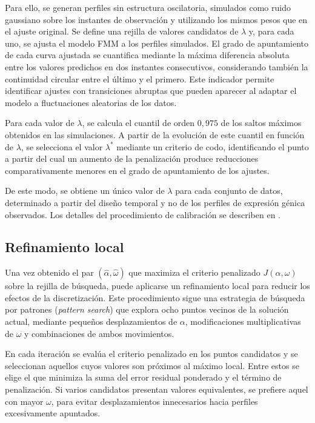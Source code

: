 \documentclass[12pt, a4paper]{report}
\begin{document}
Para ello, se generan perfiles sin estructura oscilatoria, simulados como ruido gaussiano sobre los instantes de observación y utilizando los mismos pesos que en el ajuste original. Se define una rejilla de valores candidatos de \(\lambda\) y, para cada uno, se ajusta el modelo FMM a los perfiles simulados. El grado de apuntamiento de cada curva ajustada se cuantifica mediante la máxima diferencia absoluta entre los valores predichos en dos instantes consecutivos, considerando también la continuidad circular entre el último y el primero. Este indicador permite identificar ajustes con transiciones abruptas que pueden aparecer al adaptar el modelo a fluctuaciones aleatorias de los datos.

Para cada valor de \(\lambda\), se calcula el cuantil de orden \(0{,}975\) de los saltos máximos obtenidos en las simulaciones. A partir de la evolución de este cuantil en función de \(\lambda\), se selecciona el valor \(\lambda^{*}\) mediante un criterio de codo, identificando el punto a partir del cual un aumento de la penalización produce reducciones comparativamente menores en el grado de apuntamiento de los ajustes.

De este modo, se obtiene un único valor de \(\lambda\) para cada conjunto de datos, determinado a partir del diseño temporal y no de los perfiles de expresión génica observados. Los detalles del procedimiento de calibración se describen en \citet{Abston2026CircaFMM}.

\subsection{Refinamiento local}

Una vez obtenido el par \((\widehat{\alpha},\widehat{\omega})\) que maximiza el criterio penalizado \(J(\alpha,\omega)\) sobre la rejilla de búsqueda, puede aplicarse un refinamiento local para reducir los efectos de la discretización. Este procedimiento sigue una estrategia de búsqueda por patrones (\textit{pattern search}) que explora ocho puntos vecinos de la solución actual, mediante pequeños desplazamientos de \(\alpha\), modificaciones multiplicativas de \(\omega\) y combinaciones de ambos movimientos.

En cada iteración se evalúa el criterio penalizado en los puntos candidatos y se seleccionan aquellos cuyos valores son próximos al máximo local. Entre estos se elige el que minimiza la suma del error residual ponderado y el término de penalización. Si varios candidatos presentan valores equivalentes, se prefiere aquel con mayor \(\omega\), para evitar desplazamientos innecesarios hacia perfiles excesivamente apuntados.
\end{document}
